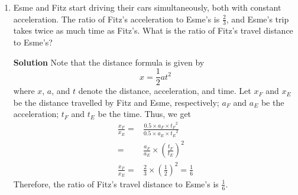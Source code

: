 \documentclass[12pt]{article}
\begin{document}
\begin{enumerate}
		\item Esme and Fitz start driving their cars simultaneously, both with constant acceleration. The ratio of Fitz's acceleration to Esme's is $\frac{2}{3}$, and Esme's trip takes twice as much time as Fitz's. What is the ratio of Fitz's travel distance to Esme's?
			\begin{mybox}{\textbf{Solution}}
				Note that the distance formula is given by
				\[ x = \frac{1}{2}at^2 \]
				where $x$, $a$, and $t$ denote the distance, acceleration, and time. Let $x_F$ and $x_E$ be the distance travelled by Fitz and Esme, respectively; $a_F$ and $a_E$ be the acceleration; $t_F$ and $t_E$ be the time. Thus, we get 
				\begin{align*}
					\frac{x_F}{x_E} = & \frac{0.5 \times a_F \times {t_F}^2 }{0.5 \times a_E \times {t_E}^2} \\
					= & \frac{a_F}{a_E} \times \left( \frac{t_F}{t_E} \right)^2 \\
					\frac{x_F}{x_E} = & \frac{2}{3} \times \left( \frac{1}{2} \right)^2 = \frac{1}{6}
				\end{align*}
				Therefore, the ratio of Fitz's travel distance to Esme's is $\boxed{\frac{1}{6}}$.
			\end{mybox}
	\end{enumerate}
	
\end{document}
